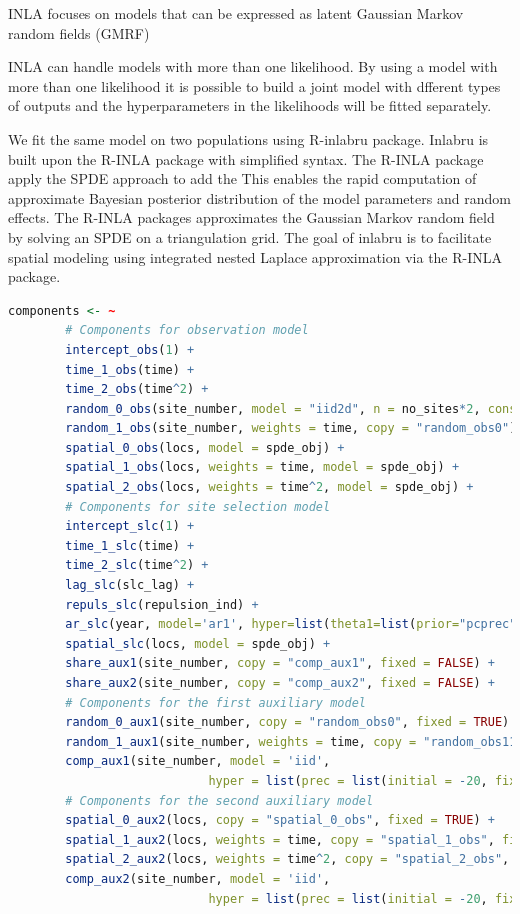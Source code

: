 INLA focuses on models that can be expressed as latent Gaussian Markov random ﬁelds (GMRF)

INLA can handle models with more than one likelihood. By using a model with more than one likelihood it is possible to build a joint model with dfferent types of outputs and the hyperparameters in the likelihoods will be ﬁtted separately.

We fit the same model on two populations using R-inlabru package. Inlabru is built upon the R-INLA 
package with simplified syntax. The R-INLA package apply the SPDE approach to add the
This enables the rapid computation of approximate Bayesian posterior distribution of the model 
parameters and random effects. The R-INLA packages approximates the Gaussian Markov random field by
solving an SPDE on a triangulation grid.
The goal of inlabru is to facilitate spatial modeling using integrated nested Laplace approximation via the R-INLA package.

\begin{lstlisting}[language = R]
	components <- ~ 
		# Components for observation model
		intercept_obs(1) +   
		time_1_obs(time) +  
		time_2_obs(time^2) +  
		random_0_obs(site_number, model = "iid2d", n = no_sites*2, constr=TRUE) +  
		random_1_obs(site_number, weights = time, copy = "random_obs0") +  
		spatial_0_obs(locs, model = spde_obj) +  
		spatial_1_obs(locs, weights = time, model = spde_obj) +  
		spatial_2_obs(locs, weights = time^2, model = spde_obj) +    
		# Components for site selection model  
		intercept_slc(1) + 
		time_1_slc(time) +  
		time_2_slc(time^2) +  
		lag_slc(slc_lag) +  
		repuls_slc(repulsion_ind) + 
		ar_slc(year, model='ar1', hyper=list(theta1=list(prior="pcprec",param=c(2, 0.01)))) +  
		spatial_slc(locs, model = spde_obj) +  
		share_aux1(site_number, copy = "comp_aux1", fixed = FALSE) +   
		share_aux2(site_number, copy = "comp_aux2", fixed = FALSE) +    
		# Components for the first auxiliary model  
		random_0_aux1(site_number, copy = "random_obs0", fixed = TRUE) +  
		random_1_aux1(site_number, weights = time, copy = "random_obs11", fixed = TRUE) +  
		comp_aux1(site_number, model = 'iid', 
							hyper = list(prec = list(initial = -20, fixed=TRUE))) +    
		# Components for the second auxiliary model  
		spatial_0_aux2(locs, copy = "spatial_0_obs", fixed = TRUE) +  
		spatial_1_aux2(locs, weights = time, copy = "spatial_1_obs", fixed = TRUE) +  
		spatial_2_aux2(locs, weights = time^2, copy = "spatial_2_obs", fixed = TRUE) +  
		comp_aux2(site_number, model = 'iid', 
							hyper = list(prec = list(initial = -20, fixed=TRUE)))
\end{lstlisting} \label{code:inlabru_components}


